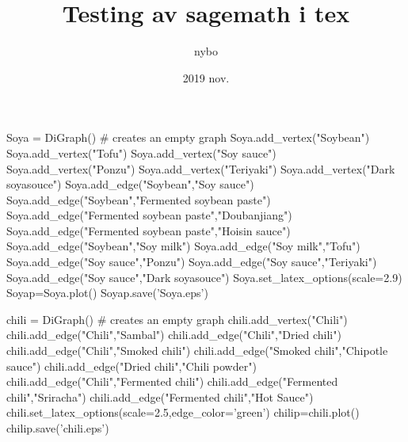 \documentclass{article}
\title{Testing av sagemath i tex}
\date{2019   nov.}
\author{nybo}
\begin{document}
\maketitle

\begin{sagesilent}
Soya = DiGraph()             # creates an empty graph
Soya.add_vertex("Soybean")
Soya.add_vertex("Tofu")
Soya.add_vertex("Soy sauce")
Soya.add_vertex("Ponzu")
Soya.add_vertex("Teriyaki")
Soya.add_vertex("Dark soyasouce")
Soya.add_edge("Soybean","Soy sauce")
Soya.add_edge("Soybean","Fermented soybean paste")
Soya.add_edge("Fermented soybean paste","Doubanjiang")
Soya.add_edge("Fermented soybean paste","Hoisin sauce")
Soya.add_edge("Soybean","Soy milk")
Soya.add_edge("Soy milk","Tofu")
Soya.add_edge("Soy sauce","Ponzu")
Soya.add_edge("Soy sauce","Teriyaki")
Soya.add_edge("Soy sauce","Dark soyasouce")
Soya.set_latex_options(scale=2.9)
Soyap=Soya.plot()
Soyap.save('Soya.eps')

chili = DiGraph()             # creates an empty graph
chili.add_vertex("Chili")
chili.add_edge("Chili","Sambal")
chili.add_edge("Chili","Dried chili")
chili.add_edge("Chili","Smoked chili")
chili.add_edge("Smoked chili","Chipotle sauce")
chili.add_edge("Dried chili","Chili powder")
chili.add_edge("Chili","Fermented chili")
chili.add_edge("Fermented chili","Sriracha")
chili.add_edge("Fermented chili","Hot Sauce")
chili.set_latex_options(scale=2.5,edge_color='green')
chilip=chili.plot()
chilip.save('chili.eps')
\end{sagesilent}
\begin{center}
\end{center}
\begin{center}
\end{center}
\end{document}

